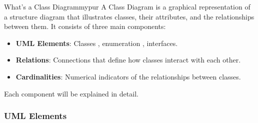\begin{prettyBox}{What's a Class Diagram}{mypur}
A Class Diagram is a graphical representation of a structure diagram that illustrates classes, their attributes, and the relationships between them. It consists of three main components:
\begin{itemize}
    \item \textbf{UML Elements}: Classes , enumeration , interfaces.
    \item \textbf{Relations}: Connections that define how classes interact with each other.
    \item \textbf{Cardinalities}: Numerical indicators of the relationships between classes.
\end{itemize}

Each component will be explained in detail.
\end{prettyBox}

\subsubsection{UML Elements}


